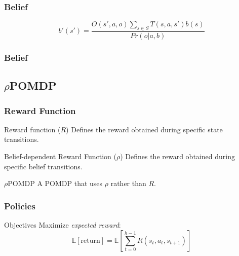 \documentclass[xcolor={dvipsnames}]{beamer}
\begin{document}
\begin{frame}
\frametitle{Belief}
\begin{equation}
 b'(s') = \frac{O(s', a, o)\sum_{s\in S}T(s,a,s')b(s)}{Pr(o|a,b)} \nonumber
\end{equation}
\end{frame}

\begin{frame}
\frametitle{Belief}
\begin{center}
\end{center}
\end{frame}

\subsection{$\rho$POMDP}

\begin{frame}
\frametitle{Reward Function}
\begin{block}{Reward function ($R$)}
    Defines the reward obtained during specific state transitions.
\end{block}
\begin{block}{Belief-dependent Reward Function ($\rho$)}
    Defines the reward obtained during specific belief transitions.
\end{block}
\begin{block}{$\rho$POMDP}
    A POMDP that uses $\rho$ rather than $R$.
\end{block}
\end{frame}

\begin{frame}
\frametitle{Policies}
\begin{block}{Objectives}
Maximize \textit{expected reward}:
\begin{equation}
 \mathbb{E}[\text{return}] = \mathbb{E} \left [ \sum_{t=0}^{h-1} R(s_t, a_t, s_{t+1}) \right ] \nonumber
\end{equation}
\end{block}
\end{frame}
\end{document}
